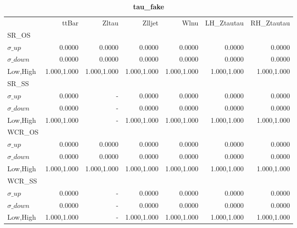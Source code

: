 \documentclass[11pt,oneside,a4paper]{article}
\begin{document}
\begin{table}
\caption{\bf{tau\_fake}}
\centering
\begin{tabular}{lrrrrrr}
& ttBar & Zltau & Zlljet & Wlnu & LH\_Ztautau & RH\_Ztautau \\

SR\_OS &  &  &  &  &  &  \\
$\sigma\_up$ & 0.0000 & 0.0000 & 0.0000 & 0.0000 & 0.0000 & 0.0000 \\
$\sigma\_down$ & 0.0000 & 0.0000 & 0.0000 & 0.0000 & 0.0000 & 0.0000 \\
Low,High & 1.000,1.000 & 1.000,1.000 & 1.000,1.000 & 1.000,1.000 & 1.000,1.000 & 1.000,1.000 \\

\hline
SR\_SS &  &  &  &  &  &  \\
$\sigma\_up$ & 0.0000 & - & 0.0000 & 0.0000 & 0.0000 & 0.0000 \\
$\sigma\_down$ & 0.0000 & - & 0.0000 & 0.0000 & 0.0000 & 0.0000 \\
Low,High & 1.000,1.000 & - & 1.000,1.000 & 1.000,1.000 & 1.000,1.000 & 1.000,1.000 \\

\hline
WCR\_OS &  &  &  &  &  &  \\
$\sigma\_up$ & 0.0000 & 0.0000 & 0.0000 & 0.0000 & 0.0000 & 0.0000 \\
$\sigma\_down$ & 0.0000 & 0.0000 & 0.0000 & 0.0000 & 0.0000 & 0.0000 \\
Low,High & 1.000,1.000 & 1.000,1.000 & 1.000,1.000 & 1.000,1.000 & 1.000,1.000 & 1.000,1.000 \\

\hline
WCR\_SS &  &  &  &  &  &  \\
$\sigma\_up$ & 0.0000 & - & 0.0000 & 0.0000 & 0.0000 & 0.0000 \\
$\sigma\_down$ & 0.0000 & - & 0.0000 & 0.0000 & 0.0000 & 0.0000 \\
Low,High & 1.000,1.000 & - & 1.000,1.000 & 1.000,1.000 & 1.000,1.000 & 1.000,1.000 \\

\hline
\end{tabular}
\end{table}
\end{document}

